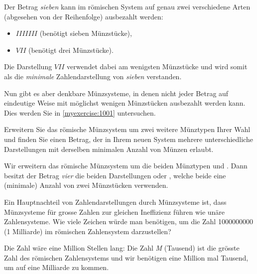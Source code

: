 \begin{myexample}\label{myexample:notUnique}
Der Betrag \textit{sieben} kann im römischen System auf genau zwei verschiedene Arten (abgesehen von der Reihenfolge) ausbezahlt werden:
\begin{itemize}
	\item $IIIIIII$ (benötigt sieben Münzstücke),
	\item $VII$ (benötigt drei Münzstücke).
\end{itemize}
Die Darstellung $VII$ verwendet dabei am wenigsten Münzstücke und wird somit als die \textit{minimale} Zahlendarstellung von
\textit{sieben} verstanden.
\end{myexample}
Nun gibt es aber denkbare Münzsysteme, in denen nicht jeder Betrag auf eindeutige Weise mit möglichst wenigen
Münzstücken ausbezahlt werden kann. Dies werden Sie in \cref{myexercise:1001} untersuchen.

\begin{myexercise}\label{myexercise:1001}
	Erweitern Sie das römische Münzsystem um zwei weitere Münztypen Ihrer Wahl und finden Sie einen Betrag, der in Ihrem
	neuen System mehrere unterschiedliche Darstellungen mit derselben minimalen Anzahl von Münzen erlaubt.
	\begin{myanswer}
		Wir erweitern das römische Münzsystem um die beiden Münztypen  und . Dann besitzt der Betrag
		\textit{vier} die beiden Darstellungen  oder \coin{II}, welche beide eine (minimale) Anzahl von zwei Münzstücken verwenden.
	\end{myanswer}
\end{myexercise}


\begin{myexercise}\label{myexercise:grosse-roem-zahlen}
	Ein Hauptnachteil von Zahlendarstellungen durch Münzsysteme ist, dass Münzsysteme für grosse Zahlen zur gleichen Ineffizienz führen wie unäre Zahlensysteme. Wie viele Zeichen würde man benötigen, um die Zahl \num{1000000000} (1 Milliarde) im römischen Zahlensystem darzustellen?
	\begin{myanswer}
		Die Zahl wäre eine Million Stellen lang: Die Zahl \textit{M} (Tausend) ist die grösste Zahl des römischen Zahlensystems und wir benötigen eine Million mal Tausend, um auf eine Milliarde zu kommen.
	\end{myanswer}
\end{myexercise}
